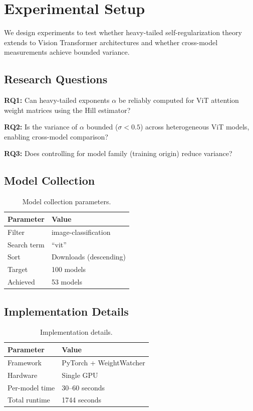 \section{Experimental Setup}
\label{sec:experiments}

We design experiments to test whether heavy-tailed self-regularization theory extends to Vision Transformer architectures and whether cross-model measurements achieve bounded variance.

\subsection{Research Questions}

\textbf{RQ1:} Can heavy-tailed exponents $\alpha$ be reliably computed for ViT attention weight matrices using the Hill estimator?

\textbf{RQ2:} Is the variance of $\alpha$ bounded ($\sigma < 0.5$) across heterogeneous ViT models, enabling cross-model comparison?

\textbf{RQ3:} Does controlling for model family (training origin) reduce variance?

\subsection{Model Collection}

\begin{table}[h]
\centering
\begin{tabular}{@{}ll@{}}
\toprule
Parameter & Value \\
\midrule
Filter & image-classification \\
Search term & ``vit'' \\
Sort & Downloads (descending) \\
Target & 100 models \\
Achieved & 53 models \\
\bottomrule
\end{tabular}
\caption{Model collection parameters.}
\label{tab:collection}
\end{table}

\subsection{Implementation Details}

\begin{table}[h]
\centering
\begin{tabular}{@{}ll@{}}
\toprule
Parameter & Value \\
\midrule
Framework & PyTorch + WeightWatcher \\
Hardware & Single GPU \\
Per-model time & 30--60 seconds \\
Total runtime & 1744 seconds \\
\bottomrule
\end{tabular}
\caption{Implementation details.}
\label{tab:implementation}
\end{table}


